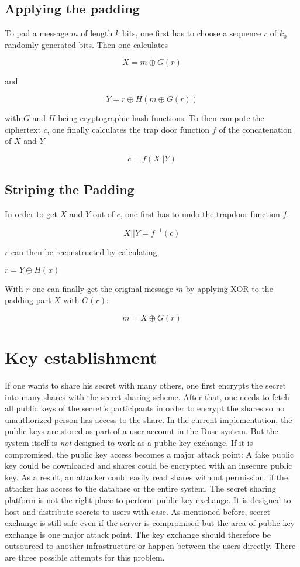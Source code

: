 \subsection{Applying the padding}

To pad a message $m$ of length $k$ bits, one first has to choose a sequence
$r$ of $k_0$ randomly generated bits. Then one calculates

$$X = m \oplus G(r)$$

and

$$Y = r \oplus H(m \oplus G(r))$$

with $G$ and $H$ being cryptographic hash functions. To then compute the
ciphertext $c$, one finally calculates the trap door function $f$ of the
concatenation of $X$ and $Y$

$$c = f(X || Y)$$

\subsection{Striping the Padding}

In order to get $X$ and $Y$ out of $c$, one first has to undo the
trapdoor function $f$.

$$X || Y = f^{-1}(c)$$

$r$ can then be reconstructed by calculating

$r = Y \oplus H(x)$

With $r$ one can finally get the original message $m$ by applying XOR
to the padding part $X$ with $G(r)$:

$$m = X \oplus G(r)$$

\cite{bellare1995optimal}

\section{Key establishment}
\label{sec:key_establishment}

If one wants to share his secret with many others, one first encrypts the
secret into many shares with the secret sharing scheme. After that, one needs
to fetch all public keys of the secret's participants in order to encrypt the
shares so no unauthorized person has access to the share. In the current
implementation, the public keys are stored as part of a user account in the
Duse system. But the system itself is \textit{not} designed to work as a public
key exchange. If it is compromised, the public key access becomes a major
attack point: A fake public key could be downloaded and shares could be
encrypted with an insecure public key. As a result, an attacker could easily
read shares without permission, if the attacker has access to the database or
the entire system. The secret sharing platform is not the right place to
perform public key exchange. It is designed to host and distribute secrets to
users with ease.  As mentioned before, secret exchange is still safe even if
the server is compromised but the area of public key exchange is one major
attack point.  The key exchange should therefore be outsourced to another
infrastructure or happen between the users directly. There are three possible
attempts for this problem.

